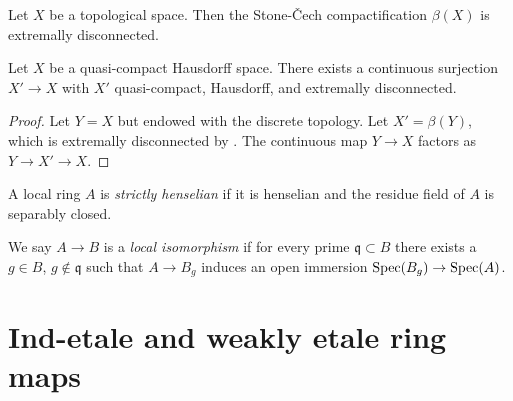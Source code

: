 \begin{theorem}
    Let \(X\) be a topological space. Then the Stone-Čech compactification \(\beta(X)\) is extremally disconnected.
    \label{thm:stone-cech-extremally-disconnected}
    \mathlibok
\end{theorem}

\begin{proposition}
  Let $X$ be a quasi-compact Hausdorff space. There exists a continuous surjection $X' \to X$ with $X'$ quasi-compact, Hausdorff, and extremally disconnected.
  \label{thm:extremally-disconnected-cover}
\end{proposition}

\begin{proof}
  Let $Y=X$ but endowed with the discrete topology. Let $X'=\beta (Y)$, which is extremally disconnected by . The continuous map $Y \to X$ factors as $Y \to X' \to X$. 
\end{proof}

\begin{definition}
    \label{def:strictly-henselian-local-ring}
    A local ring \(A\) is \emph{strictly henselian} if it is henselian and the residue field of \(A\) is separably closed.
\end{definition}

\begin{definition}
  \label{def:local-isomorphism}

  We say $A \to B$ is a \emph{local isomorphism} if for every prime $\mathfrak{q} \subset B$ there exists a $g \in B$, $g \notin \mathfrak{q}$ such that $A \to B_g$ induces an open immersion $\operatorname{Spec} (B_g) \to \operatorname{Spec} (A)$.
\end{definition}

\section{Ind-etale and weakly etale ring maps}

